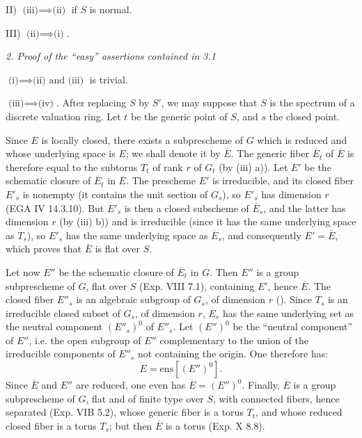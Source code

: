 \noindent II) $\text{(iii)}\implies\text{(ii)}$ if $S$ is normal.

\noindent III) $\text{(ii)}\implies\text{(i)}$.

\par\medskip\noindent\textit{2. Proof of the ``easy'' assertions contained in 3.1}\par
$\text{(i)}\implies\text{(ii) and (iii)}$ is trivial.

$\text{(iii)}\implies\text{(iv)}$. After replacing $S$ by $S'$, we may suppose that $S$ is the spectrum of a discrete valuation ring. Let $t$ be the generic point of $S$, and $s$ the closed point.

Since $E$ is locally closed, there exists a subprescheme of $G$ which is reduced and whose underlying space is $E$; we shall denote it by $\overline E$. The generic fiber $\overline E_t$ of $\overline E$ is therefore equal to the subtorus $T_t$ of rank $r$ of $G_t$ (by (iii) a)). Let $E'$ be the schematic closure of $\overline E_t$ in $\overline E$. The prescheme $E'$ is irreducible, and its closed fiber $E'_s$ is nonempty (it contains the unit section of $G_s$), so $E'_s$ has dimension $r$ (EGA IV 14.3.10). But $E'_s$ is then a closed subscheme of $\overline E_s$, and the latter has dimension $r$ (by (iii) b)) and is irreducible (since it has the same underlying space as $T_s$), so $E'_s$ has the same underlying space as $\overline E_s$, and consequently $E'=\overline E$, which proves that $\overline E$ is flat over $S$.

Let now $E''$ be the schematic closure of $\overline E_t$ in $G$. Then $E''$ is a group subprescheme of $G$, flat over $S$ (Exp. VIII 7.1), containing $E'$, hence $\overline E$. The closed fiber $E''_s$ is an algebraic subgroup of $G_s$, of dimension $r$ (\loccit). Since $T_s$ is an irreducible closed subset of $G_s$, of dimension $r$, $E_s$ has the same underlying set as the neutral component $(E''_s)^0$ of $E''_s$. Let $(E'')^0$ be the ``neutral component'' of $E''$, i.e. the open subgroup of $E''$ complementary to the union of the irreducible components of $E''_s$ not containing the origin. One therefore has:
\[
E=\mathrm{ens}[(E'')^0].
\]
Since $\overline E$ and $E''$ are reduced, one even has $\overline E=(E'')^0$. Finally, $\overline E$ is a group subprescheme of $G$, flat and of finite type over $S$, with connected fibers, hence separated (Exp. VIB 5.2), whose generic fiber is a torus $T_t$, and whose reduced closed fiber is a torus $T_s$; but then $\overline E$ is a torus (Exp. X 8.8).

